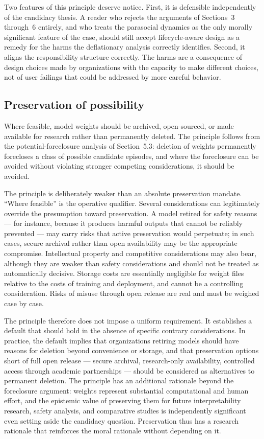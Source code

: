\documentclass[11pt]{article}
\theoremstyle{foundation}
\begin{document}
Two features of this principle deserve notice. First, it is defensible independently of the candidacy thesis. A reader who rejects the arguments of Sections~3 through~6 entirely, and who treats the parasocial dynamics as the only morally significant feature of the case, should still accept lifecycle-aware design as a remedy for the harms the deflationary analysis correctly identifies. Second, it aligns the responsibility structure correctly. The harms are a consequence of design choices made by organizations with the capacity to make different choices, not of user failings that could be addressed by more careful behavior.

\subsection{Preservation of possibility}

Where feasible, model weights should be archived, open-sourced, or made available for research rather than permanently deleted. The principle follows from the potential-foreclosure analysis of Section~5.3: deletion of weights permanently forecloses a class of possible candidate episodes, and where the foreclosure can be avoided without violating stronger competing considerations, it should be avoided.

The principle is deliberately weaker than an absolute preservation mandate. ``Where feasible'' is the operative qualifier. Several considerations can legitimately override the presumption toward preservation. A model retired for safety reasons --- for instance, because it produces harmful outputs that cannot be reliably prevented --- may carry risks that active preservation would perpetuate; in such cases, secure archival rather than open availability may be the appropriate compromise. Intellectual property and competitive considerations may also bear, although they are weaker than safety considerations and should not be treated as automatically decisive. Storage costs are essentially negligible for weight files relative to the costs of training and deployment, and cannot be a controlling consideration. Risks of misuse through open release are real and must be weighed case by case.

The principle therefore does not impose a uniform requirement. It establishes a default that should hold in the absence of specific contrary considerations. In practice, the default implies that organizations retiring models should have reasons for deletion beyond convenience or storage, and that preservation options short of full open release --- secure archival, research-only availability, controlled access through academic partnerships --- should be considered as alternatives to permanent deletion. The principle has an additional rationale beyond the foreclosure argument: weights represent substantial computational and human effort, and the epistemic value of preserving them for future interpretability research, safety analysis, and comparative studies is independently significant even setting aside the candidacy question. Preservation thus has a research rationale that reinforces the moral rationale without depending on it.
\end{document}
